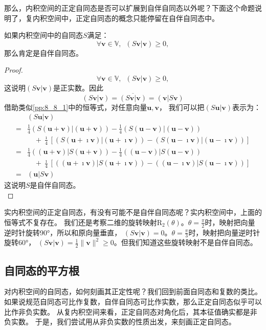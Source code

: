 \documentclass[12pt,UTF8]{ctexbook}
\begin{document}
那么，内积空间的正定自同态是否可以扩展到自伴自同态以外呢？下面这个命题说明了，复内积空间中，正定自同态的概念只能停留在自伴自同态中。
\begin{pp}\label{pp:8_11}
    如果内积空间中的自同态$S$满足：
    $$ \forall \mathbf{v} \in \mathbb{V}, \,\,\, (S\mathbf{v} | \mathbf{v}) \geqslant 0,$$
    那么肯定是自伴自同态。
\end{pp}
\begin{proof} %
    $$ \forall \mathbf{v} \in \mathbb{V}, \,\,\, (S\mathbf{v} | \mathbf{v}) \geqslant 0,$$
    这说明$(S\mathbf{v} | \mathbf{v})$是正实数。因此
    $$ (S\mathbf{v} | \mathbf{v}) = \overline{(S\mathbf{v} | \mathbf{v})} = (\mathbf{v} | S\mathbf{v})$$
    借助类似\ref{pp:8_8_1}中的恒等式，对任意向量$\mathbf{u}, \mathbf{v}$，
    我们可以把$(S\mathbf{u} | \mathbf{v})$表示为：
    \begin{align*}
        &(S\mathbf{u} | \mathbf{v})  \\
        =&\frac14(S(\mathbf{u}+\mathbf{v})|(\mathbf{u}+\mathbf{v})) - \frac14(S(\mathbf{u}-\mathbf{v})|(\mathbf{u}-\mathbf{v}))  \\
        &\quad + \frac{\imath }{4}\left[(S(\mathbf{u}+\imath \mathbf{v})|(\mathbf{u}+\imath \mathbf{v})) - (S(\mathbf{u}-\imath \mathbf{v})|(\mathbf{u}-\imath \mathbf{v}))\right]  \\
        =&\frac14((\mathbf{u}+\mathbf{v})|S(\mathbf{u}+\mathbf{v})) - \frac14((\mathbf{u}-\mathbf{v})|S(\mathbf{u}-\mathbf{v}))  \\
        &\quad + \frac{\imath }{4}\left[((\mathbf{u}+\imath \mathbf{v})|S(\mathbf{u}+\imath \mathbf{v})) - ((\mathbf{u}-\imath \mathbf{v})|S(\mathbf{u}-\imath \mathbf{v}))\right]  \\
        =&(\mathbf{u} | S\mathbf{v}) 
    \end{align*}
    这说明$S$是自伴自同态。\\
\end{proof}

实内积空间的正定自同态，有没有可能不是自伴自同态呢？实内积空间中，上面的恒等式不复存在。
我们还是考察二维的旋转映射$\mathrm{R}_2(\theta)$。$\theta = \frac{\pi}{2}$时，映射把向量逆时针旋转90°，所以和原向量垂直，
$(S\mathbf{v} | \mathbf{v}) = 0$。$\theta = \frac{\pi}{3}$时，映射把向量逆时针旋转60°，
$(S\mathbf{v} | \mathbf{v}) = \frac{1}{2}\|\mathbf{v}\|^2 \geqslant 0$。但我们知道这些旋转映射不是自伴自同态。

\subsection{自同态的平方根}
对内积空间的自同态，如何刻画其正定性呢？我们回到前面自同态和复数的类比。
如果说规范自同态可比作复数，自伴自同态可比作实数，那么正定自同态似乎可以比作非负实数。
从复内积空间来看，正定自同态对角化后，其本征值确实都是非负实数。
于是，我们尝试用从非负实数的性质出发，来刻画正定自同态。
\end{document}
